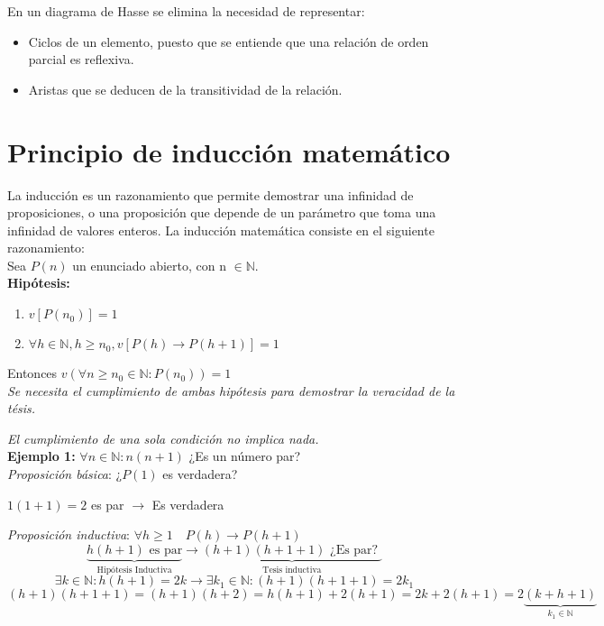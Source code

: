 \documentclass[a4paper, twoside]{article}
\begin{document}
En un diagrama de Hasse se elimina la necesidad de representar:
\begin{itemize}
	\item Ciclos de un elemento, puesto que se entiende que una relación de orden parcial es reflexiva.
	\item Aristas que se deducen de la transitividad de la relación.
\end{itemize}

\newpage
\section{Principio de inducción matemático}
La inducción es un razonamiento que permite demostrar una infinidad de proposiciones, o una proposición que depende de un parámetro que toma una infinidad de valores enteros. 
La inducción matemática consiste en el siguiente razonamiento:\\

Sea $P(n)$ un enunciado abierto, con n $\in \mathbb{N}$.\\

\textbf{Hipótesis:}
\begin{enumerate}
	\item $v[P(n_{0})] = 1 $
	\item $ \forall h \in \mathbb{N} , h \geqslant n_{0} , v[P(h) \rightarrow P(h+1)] = 1$
\end{enumerate}

Entonces $v(\forall n \geqslant n_{0} \in \mathbb{N} : P(n_{0})) = 1$\\

\emph{Se necesita el cumplimiento de ambas hipótesis para demostrar la veracidad de la tésis.}

\emph{El cumplimiento de una sola condición no implica nada.}\\

\textbf{Ejemplo 1:} 
$\forall n \in \mathbb{N}: n(n+1)$ ¿Es un número par?\\

\emph{Proposición básica}: ¿$P(1)$ es verdadera?
\begin{center}
	$1(1+1) = 2$ es par $\rightarrow$ Es verdadera
\end{center}

\emph{Proposición inductiva}: $\forall h \geq 1 \quad P(h) \rightarrow P(h+1)$
\begin{equation*}
	\underbrace{h(h+1) \text{ es par}}_\text{Hipótesis Inductiva} \rightarrow \underbrace{(h+1)(h+1+1) \text{ ¿Es par? }}_\text{Tesis inductiva}
\end{equation*}
\begin{equation*}
	\exists k \in \mathbb{N}: h(h+1) = 2k \rightarrow \exists k_{1} \in \mathbb{N}: (h+1)(h+1+1) = 2k_{1}
\end{equation*}
\begin{equation*}
	(h+1)(h+1+1) = (h+1)(h+2) = h(h+1) + 2(h+1) = 2k + 2 (h+1) = 2 \underbrace{(k+h+1)}_{k_{1} \in \mathbb{N}}
\end{equation*}
\end{document}
